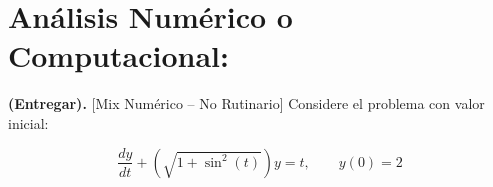 
\section{Análisis Numérico o Computacional:}


 \textbf{(Entregar).} [Mix Numérico -- No Rutinario] Considere el problema
con valor inicial:

\[
    \frac{dy}{dt} + \left(\sqrt{1+\sin^2(t)}\right)y = t, \qquad y(0)=2
\]

